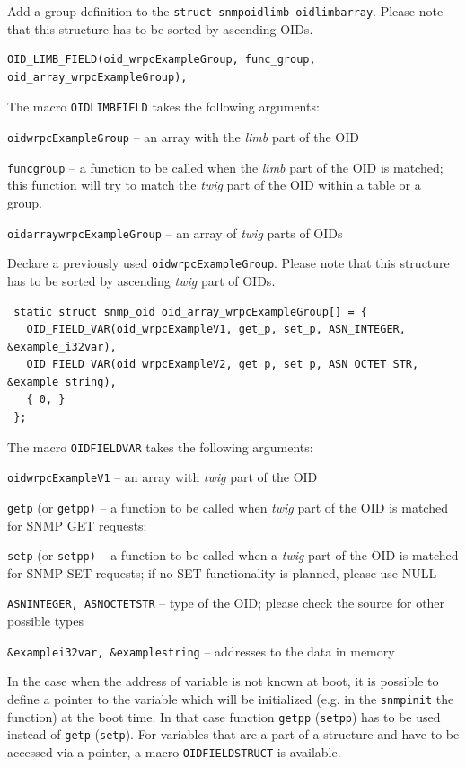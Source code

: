 \documentclass[a4paper, 12pt]{article}
\renewcommand{\_}{\underscore\allowbreak}
\begin{document}
\begin{itemize*}
\item Add a group definition to the \texttt{struct snmp\_oid\_limb oid\_limb\_array}.
      Please note that this structure has to be sorted by ascending OIDs.
\begin{lstlisting}
OID_LIMB_FIELD(oid_wrpcExampleGroup, func_group, oid_array_wrpcExampleGroup),
\end{lstlisting}
The macro \texttt{OID\_LIMB\_FIELD} takes the following arguments:
\begin{itemize*}
   \item \texttt{oid\_wrpcExampleGroup} -- an array with the \textit{limb} part of the
         OID
   \item \texttt{func\_group} -- a function to be called when the \textit{limb} part of
         the OID is matched; this function will try to match the \textit{twig} part
         of the OID within a table or a group.
   \item \texttt{oid\_array\_wrpcExampleGroup} -- an array of \textit{twig} parts of OIDs
\end{itemize*}
\item Declare a previously used \texttt{oid\_wrpcExampleGroup}. Please note that
      this structure has to be sorted by ascending \textit{twig} part of OIDs.
\begin{lstlisting}
 static struct snmp_oid oid_array_wrpcExampleGroup[] = {
   OID_FIELD_VAR(oid_wrpcExampleV1, get_p, set_p, ASN_INTEGER,   &example_i32var),
   OID_FIELD_VAR(oid_wrpcExampleV2, get_p, set_p, ASN_OCTET_STR, &example_string),
   { 0, }
 };
\end{lstlisting}
The macro \texttt{OID\_FIELD\_VAR} takes the following arguments:
\begin{itemize*}
   \item \texttt{oid\_wrpcExampleV1} -- an array with \textit{twig} part of the OID
   \item \texttt{get\_p} (or \texttt{get\_pp)} -- a function to be called when \textit{twig}
         part of the OID is matched for SNMP GET requests;
   \item \texttt{set\_p} (or \texttt{set\_pp)} -- a function to be called when a \textit{twig}
         part of the OID is matched for SNMP SET requests; if no SET
         functionality is planned, please use NULL
   \item \texttt{ASN\_INTEGER, ASN\_OCTET\_STR} -- type of the OID; please
         check the source for other possible types
   \item \texttt{\&example\_i32var, \&example\_string} -- addresses to the data in
         memory
\end{itemize*}
In the case when the address of variable is not known at boot, it is possible to define
a pointer to the variable which will be initialized (e.g. in the \texttt{snmp\_init}
the function) at the boot time. In that case function \texttt{get\_pp} (\texttt{set\_pp}) has
to be used instead of \texttt{get\_p} (\texttt{set\_p}). For variables that are a part of
a structure and have to be accessed via a pointer, a macro \texttt{OID\_FIELD\_STRUCT}
is available.


\end{itemize*}
\end{document}
